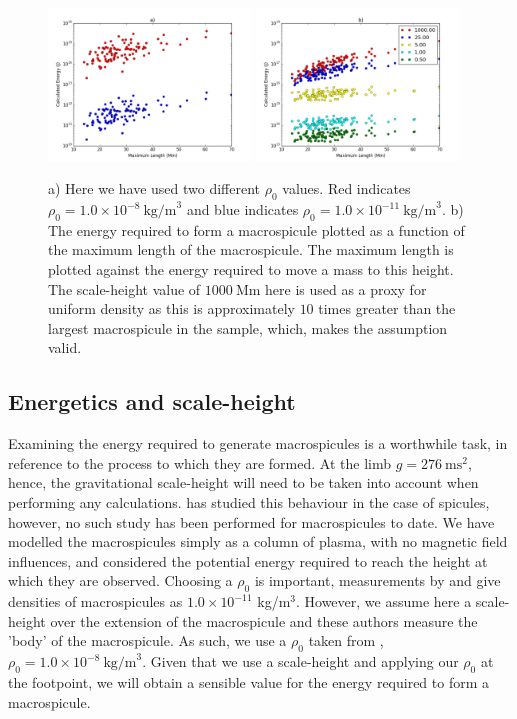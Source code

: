 \begin{figure}[h!]
	\centering
	\includegraphics[width=0.48\textwidth]{Chapter3/Figs/diff_rho0.pdf}
	\includegraphics[width=0.48\textwidth]{Chapter3/Figs/scale_h.pdf}
	\caption{\small a) Here we have used two different $\rho_0$ values. Red indicates $\rho_0 = 1.0 \times 10^{-8}\ \textrm{kg/m}^{3}$ and blue indicates $\rho_0 = 1.0 \times 10^{-11}\ \textrm{kg/m}^{3}$. b) The energy required to form a macrospicule plotted as a function of the maximum length of the macrospicule. The maximum length is plotted against the energy required to move a mass to this height. The scale-height value of $1000\ \textrm{Mm}$ here is used as a proxy for uniform density as this is approximately $10$ times greater than the largest macrospicule in the sample, which, makes the assumption valid.}
	\label{fig:scale_h}
\end{figure}

\subsection{Energetics and scale-height}
Examining the energy required to generate macrospicules is a worthwhile task, in reference to the process to which they are formed. At the limb $g = 276\ \textrm{ms}^2$, hence, the gravitational scale-height will need to be taken into account when performing any calculations. \cite{Pereira2012} has studied this behaviour in the case of spicules, however, no such study has been performed for macrospicules to date. We have modelled the macrospicules simply as a column of plasma, with no magnetic field influences, and considered the potential energy required to reach the height at which they are observed. Choosing a $\rho_0$ is important, measurements by \cite{Parenti2002} and \cite{Withbroe1976} give densities of macrospicules as $1.0 \times 10^{-11}$ kg/m$^{3}$. However, we assume here a scale-height over the extension of the macrospicule and these authors measure the 'body' of the macrospicule. As such, we use a $\rho_0$ taken from \cite{Vernazza1981}, $\rho_0 = 1.0 \times 10^{-8}\ \textrm{kg/m}^{3}$. Given that we use a scale-height and applying our $\rho_0$ at the footpoint, we will obtain a sensible value for the energy required to form a macrospicule.

